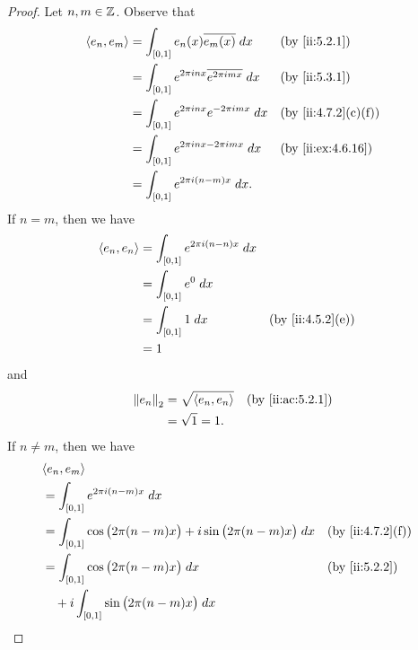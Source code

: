 \begin{proof}
  Let \(n, m \in \mathbb{Z}\).
  Observe that
  \begin{align*}
    \inner*{e_n, e_m} & = \int_{[0, 1]} e_n(x) \overline{e_m(x)} \; dx                   &  & \by{ii:5.2.1}      \\
                      & = \int_{[0, 1]} e^{2 \pi i n x} \overline{e^{2 \pi i m x}} \; dx &  & \by{ii:5.3.1}      \\
                      & = \int_{[0, 1]} e^{2 \pi i n x} e^{- 2 \pi i m x} \; dx          &  & \by{ii:4.7.2}[c,f] \\
                      & = \int_{[0, 1]} e^{2 \pi i n x - 2 \pi i m x} \; dx              &  & \by{ii:ex:4.6.16}  \\
                      & = \int_{[0, 1]} e^{2 \pi i (n - m) x} \; dx.
  \end{align*}
  If \(n = m\), then we have
  \begin{align*}
    \inner*{e_n, e_n} & = \int_{[0, 1]} e^{2 \pi i (n - n) x} \; dx                       \\
                      & = \int_{[0, 1]} e^0 \; dx                                         \\
                      & = \int_{[0, 1]} 1 \; dx                     &  & \by{ii:4.5.2}[e] \\
                      & = 1
  \end{align*}
  and
  \begin{align*}
    \norm*{e_n}_2 & = \sqrt{\inner*{e_n, e_n}} &  & \by{ii:ac:5.2.1} \\
                  & = \sqrt{1} = 1.
  \end{align*}
  If \(n \neq m\), then we have
  \begin{align*}
     & \inner*{e_n, e_m}                                                                                                     \\
     & = \int_{[0, 1]} e^{2 \pi i (n - m) x} \; dx                                                                           \\
     & = \int_{[0, 1]} \cos\big(2 \pi (n - m) x\big) + i \sin\big(2 \pi (n - m) x\big) \; dx        &  & \by{ii:4.7.2}[f]    \\
     & = \int_{[0, 1]} \cos\big(2 \pi (n - m) x\big) \; dx                                          &  & \by{ii:5.2.2}       \\
     & \quad + i \int_{[0, 1]} \sin\big(2 \pi (n - m) x\big) \; dx                                                           \\

\end{align*}
\end{proof}
